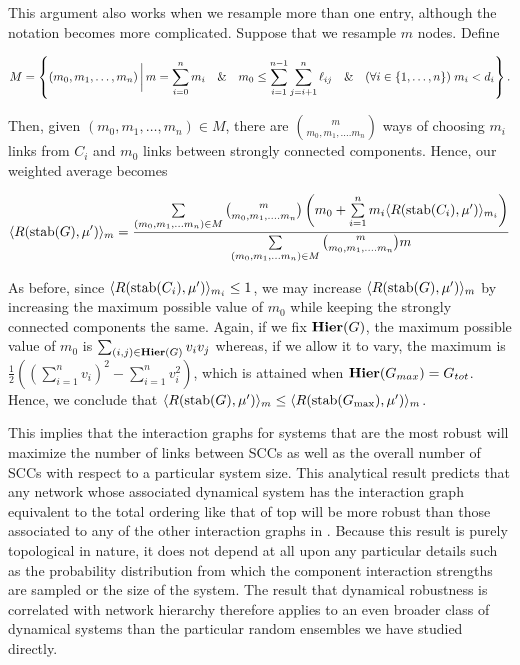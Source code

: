 This argument also works when we resample more than one entry,
although the notation becomes more complicated.  Suppose that we
resample $m$ nodes.  Define
\begin{widetext}
\begin{equation*}
M = \left\{(m_0, m_1, \ldots, m_n) \,\bigg|\,
m = \sum_{i=0}^n m_i \quad\&\quad
m_0 \le \sum_{i=1}^{n-1} \sum_{j=i+1}^n \ell_{ij} \quad\&\quad
(\forall i \in \{1, \ldots, n\}) \; m_i < d_i \right\}.
\end{equation*}
\end{widetext}
Then, given $(m_0, m_1, \ldots, m_n) \in M$, there are ${m \choose
m_0, m_1, \ldots. m_n}$ ways of choosing $m_i$ links from $C_i$ and
$m_0$ links between strongly connected components.  Hence, our
weighted average becomes
\begin{widetext}
\begin{equation}
\langle R(\hbox{stab} (G), \mu') \rangle_m =
\frac{\sum\limits_{(m_0, m_1, \ldots m_n) \in M}
      {m \choose m_0, m_1, \ldots. m_n}
      \left(m_0 + \sum\limits_{i=1}^n m_i \langle R(\hbox{stab} (C_i), \mu') \rangle_{m_i} \right)}
     {\sum\limits_{(m_0, m_1, \ldots m_n) \in M}
      {m \choose m_0, m_1, \ldots. m_n} m}
\end{equation}
\end{widetext}

As before, since $\langle R(\hbox{stab} (C_i), \mu') \rangle_{m_i} \le 1$, we may
increase $\langle R(\hbox{stab} (G), \mu') \rangle_m$ by increasing the maximum
possible value of $m_0$ while keeping the strongly connected
components the same.  Again, if we fix $\mathbf{Hier}(G)$, the maximum
possible value of $m_0$ is $\sum_{(i,j) \in \mathbf{Hier}(G)} v_i v_j$
whereas, if we allow it to vary, the maximum is $\frac{1}{2} ((\sum_{i=1}^n
v_i)^2 - \sum_{i=1}^n v_i^2)$, which is attained when $\mathbf{Hier}(G_{max}) =
G_{tot}$.  Hence, we conclude that $\langle R(\hbox{stab} (G), \mu') \rangle_m \le
\langle R(\hbox{stab} (G_{\mathrm{max}}), \mu') \rangle_m$.

This implies that the interaction graphs for systems that are the most robust will maximize the number of links between SCCs as well as the overall number of SCCs with respect to a particular system size. This analytical result predicts that any network whose associated dynamical system has the interaction graph equivalent to the total ordering like that of  top will be more robust than those associated to any of the other interaction graphs in . Because this result is purely topological in nature, it does not depend at all upon any particular details such as the probability distribution from which the component interaction strengths are sampled or the size of the system. The result that dynamical robustness is correlated with network hierarchy therefore applies to an even broader class of dynamical systems than the particular random ensembles we have studied directly.

